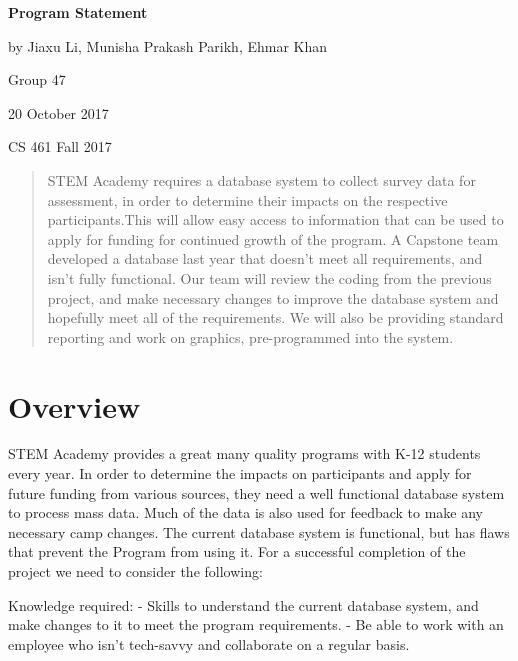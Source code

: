 \documentclass[onecolumn, draftclsnofoot,10pt, compsoc]{IEEEtran}
\begin{document}
\begin{titlepage}
		
		\begin{center}
		\bigbreak	
		\textbf{Program Statement}
	
  	by Jiaxu Li, Munisha Prakash Parikh, Ehmar Khan

  	  Group 47

  	  20 October 2017
   
		 CS 461 Fall 2017
    
   		\end{center}
        \begin{abstract}
        STEM Academy requires a database system to collect survey data for assessment, in order to determine their impacts on the respective participants.This will allow easy access to information that can be used to apply for funding for continued growth of the program. A Capstone team developed a database last year that doesn't meet all requirements, and isn't fully functional. Our team will review the coding from the previous project, and make necessary changes to improve the database system and hopefully meet all of the requirements. We will also be providing standard reporting and work on graphics, pre-programmed into the system.
        \end{abstract}     
\end{titlepage}
\newpage
{}
\tableofcontents
\clearpage

\section{Overview}
STEM Academy provides a great many quality programs with K-12 students every year. In order to determine the impacts on participants and apply for future funding from various sources, they need a well functional database system to process mass data. Much of the data is also used for feedback to make any necessary camp changes. The current database system is functional, but has flaws that prevent the Program from using it. For a successful completion of the project we need to consider the following:
\newline \newline

Knowledge required: \newline
- Skills to understand the current database system, and make changes to it to meet the program requirements. \newline
- Be able to work with an employee who isn\rq t tech-savvy and collaborate on a regular basis.\newline\newline
\end{document}
